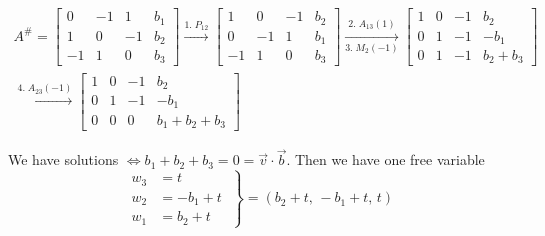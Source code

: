 \documentclass[../main.tex]{subfiles}
\begin{document}
\begin{example}[]
    \begin{gather*}
        A^\# = 
        \begin{bmatrix}
            0 & -1 & 1 & b_1 \\
            1 & 0 & -1 & b_2 \\
            -1 & 1 & 0 & b_3
        \end{bmatrix}
        \xrightarrow{1. \; P_{12}}
        \begin{bmatrix}
            1 & 0 & -1 & b_2 \\
            0 & -1 & 1 & b_1 \\
            -1 & 1 & 0 & b_3
        \end{bmatrix}
        \xrightarrow[3. \; M_2(-1)]{2. \; A_{13}(1)}
        \begin{bmatrix}
            1 & 0 & -1 & b_2 \\
            0 & 1 & -1 & -b_1 \\
            0 & 1 & -1 & b_2+b_3
        \end{bmatrix} \\
        \xrightarrow{4. \; A_{23}(-1)}
        \begin{bmatrix}
            1 & 0 & -1 & b_2 \\
            0 & 1 & -1 & -b_1 \\
            0 & 0 & 0 & b_1 + b_2 + b_3
        \end{bmatrix}
    \end{gather*}
    
    We have solutions \( \iff b_1 + b_2 + b_3 = 0 = \vec{v} \cdot \vec{b} \).
    Then we have one free variable
    \[ \left.
        \begin{aligned}
            w_3 &= t \\
            w_2 & = -b_1 + t \\
            w_1 &= b_2 + t
        \end{aligned} \;
        \right\} = \boxed{\left( b_2 + t, \, -b_1+t, \, t \right)}
    \]
\end{example}
\end{document}
